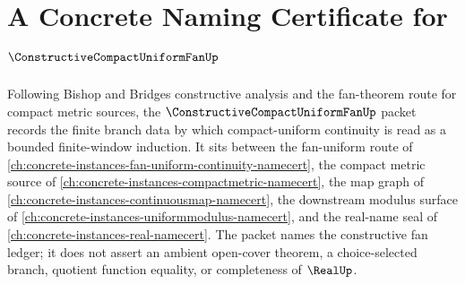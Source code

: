\chapter{A Concrete Naming Certificate for $\ConstructiveCompactUniformFanUp$}
\label{ch:concrete-instances-constructive-compact-uniform-fan-namecert}

Following Bishop and Bridges constructive analysis and the fan-theorem route for compact metric sources, the $\ConstructiveCompactUniformFanUp$ packet records the finite branch data by which compact-uniform continuity is read as a bounded finite-window induction. It sits between the fan-uniform route of \autoref{ch:concrete-instances-fan-uniform-continuity-namecert}, the compact metric source of \autoref{ch:concrete-instances-compactmetric-namecert}, the map graph of \autoref{ch:concrete-instances-continuousmap-namecert}, the downstream modulus surface of \autoref{ch:concrete-instances-uniformmodulus-namecert}, and the real-name seal of \autoref{ch:concrete-instances-real-namecert}. The packet names the constructive fan ledger; it does not assert an ambient open-cover theorem, a choice-selected branch, quotient function equality, or completeness of $\RealUp$.

